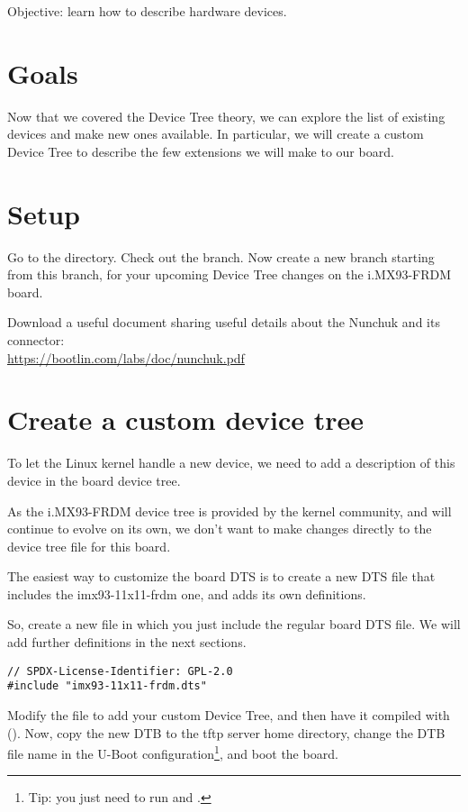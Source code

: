 {Objective: learn how to describe hardware devices.}

\section{Goals}

Now that we covered the Device Tree theory, we can explore the list of
existing devices and make new ones available. In particular, we will
create a custom Device Tree to describe the few extensions we will make
to our board.

\section{Setup}

Go to the  directory. Check out the
 branch.
Now create a new  branch starting from this branch,
for your upcoming Device Tree changes on the i.MX93-FRDM board.

Download a useful document sharing useful details about the Nunchuk
and its connector:\\
\url{https://bootlin.com/labs/doc/nunchuk.pdf}

\section{Create a custom device tree}

To let the Linux kernel handle a new device, we need to add a
description of this device in the board device tree.

As the i.MX93-FRDM device tree is provided by the kernel community,
and will continue to evolve on its own, we don't want to make changes
directly to the device tree file for this board.

The easiest way to customize the board DTS is to create a new DTS file
that includes the imx93-11x11-frdm one, and adds
its own definitions.

So, create a new
 file in which
you just include the regular board DTS file. We will add further
definitions in the next sections.

\begin{verbatim}
// SPDX-License-Identifier: GPL-2.0
#include "imx93-11x11-frdm.dts"
\end{verbatim}
Modify the  file to add your custom
Device Tree, and then have it compiled with (). Now,
copy the new DTB to the tftp server home directory, change the DTB file
name in the U-Boot configuration\footnote{Tip: you just need to run
 and .}, and boot the board.

